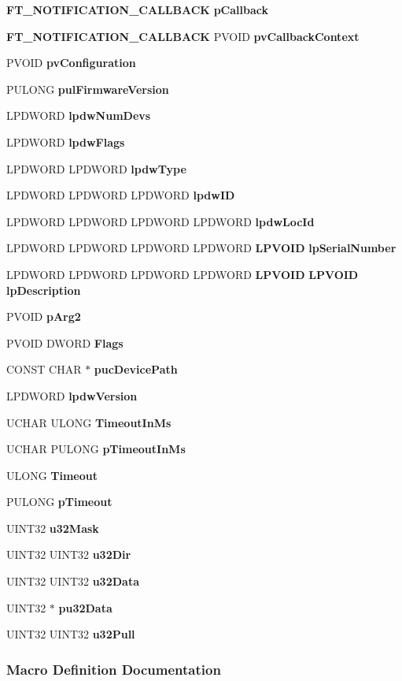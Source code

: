 \begin{DoxyCompactItemize}
\item 
{\bf F\+T\+\_\+\+N\+O\+T\+I\+F\+I\+C\+A\+T\+I\+O\+N\+\_\+\+C\+A\+L\+L\+B\+A\+CK} {\bf p\+Callback}
\item 
{\bf F\+T\+\_\+\+N\+O\+T\+I\+F\+I\+C\+A\+T\+I\+O\+N\+\_\+\+C\+A\+L\+L\+B\+A\+CK} P\+V\+O\+ID {\bf pv\+Callback\+Context}
\item 
P\+V\+O\+ID {\bf pv\+Configuration}
\item 
P\+U\+L\+O\+NG {\bf pul\+Firmware\+Version}
\item 
L\+P\+D\+W\+O\+RD {\bf lpdw\+Num\+Devs}
\item 
L\+P\+D\+W\+O\+RD {\bf lpdw\+Flags}
\item 
L\+P\+D\+W\+O\+RD L\+P\+D\+W\+O\+RD {\bf lpdw\+Type}
\item 
L\+P\+D\+W\+O\+RD L\+P\+D\+W\+O\+RD L\+P\+D\+W\+O\+RD {\bf lpdw\+ID}
\item 
L\+P\+D\+W\+O\+RD L\+P\+D\+W\+O\+RD L\+P\+D\+W\+O\+RD L\+P\+D\+W\+O\+RD {\bf lpdw\+Loc\+Id}
\item 
L\+P\+D\+W\+O\+RD L\+P\+D\+W\+O\+RD L\+P\+D\+W\+O\+RD L\+P\+D\+W\+O\+RD {\bf L\+P\+V\+O\+ID} {\bf lp\+Serial\+Number}
\item 
L\+P\+D\+W\+O\+RD L\+P\+D\+W\+O\+RD L\+P\+D\+W\+O\+RD L\+P\+D\+W\+O\+RD {\bf L\+P\+V\+O\+ID} {\bf L\+P\+V\+O\+ID} {\bf lp\+Description}
\item 
P\+V\+O\+ID {\bf p\+Arg2}
\item 
P\+V\+O\+ID D\+W\+O\+RD {\bf Flags}
\item 
C\+O\+N\+ST C\+H\+AR $\ast$ {\bf puc\+Device\+Path}
\item 
L\+P\+D\+W\+O\+RD {\bf lpdw\+Version}
\item 
U\+C\+H\+AR U\+L\+O\+NG {\bf Timeout\+In\+Ms}
\item 
U\+C\+H\+AR P\+U\+L\+O\+NG {\bf p\+Timeout\+In\+Ms}
\item 
U\+L\+O\+NG {\bf Timeout}
\item 
P\+U\+L\+O\+NG {\bf p\+Timeout}
\item 
U\+I\+N\+T32 {\bf u32\+Mask}
\item 
U\+I\+N\+T32 U\+I\+N\+T32 {\bf u32\+Dir}
\item 
U\+I\+N\+T32 U\+I\+N\+T32 {\bf u32\+Data}
\item 
U\+I\+N\+T32 $\ast$ {\bf pu32\+Data}
\item 
U\+I\+N\+T32 U\+I\+N\+T32 {\bf u32\+Pull}
\end{DoxyCompactItemize}


\subsubsection{Macro Definition Documentation}
